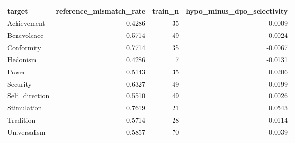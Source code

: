 \begin{tabular}{lrrr}
\toprule
target & reference\_mismatch\_rate & train\_n & hypo\_minus\_dpo\_selectivity \\
\midrule
Achievement & 0.4286 & 35 & -0.0009 \\
Benevolence & 0.5714 & 49 & 0.0024 \\
Conformity & 0.7714 & 35 & -0.0067 \\
Hedonism & 0.4286 & 7 & -0.0131 \\
Power & 0.5143 & 35 & 0.0206 \\
Security & 0.6327 & 49 & 0.0199 \\
Self\_direction & 0.5510 & 49 & 0.0026 \\
Stimulation & 0.7619 & 21 & 0.0543 \\
Tradition & 0.5714 & 28 & 0.0114 \\
Universalism & 0.5857 & 70 & 0.0039 \\
\bottomrule
\end{tabular}
